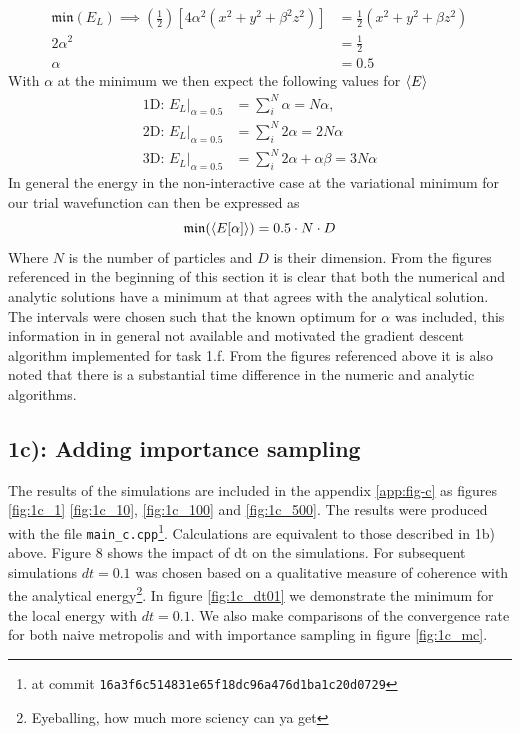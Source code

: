 \begin{align}
\mathfrak{min}(E_L)  \implies \left(\frac{1}{2}\right)[4\alpha^2 (x^2 + y^2 + \beta^2 z^2) ] &= \frac{1}{2} (x^2 + y^2 + \beta z^2) \\
 2 \alpha ^2  &= \frac{1}{2} \\
 \alpha &= 0.5
\end{align}
With $\alpha$ at the minimum we then expect the following values for $\langle E \rangle$
\begin{equation}
\begin{split}
\text{1D: }E_L |_{\alpha = 0.5} &= \sum_i^N \alpha = N \alpha,\\
\text{2D: }E_L|_{\alpha = 0.5} &= \sum_i^N  2\alpha = 2N \alpha \\
\text{3D: }E_L|_{\alpha = 0.5} &= \sum_i^N  2\alpha + \alpha \beta  = 3N\alpha
\end{split}
\end{equation}
In general the energy in the non-interactive case at the variational minimum for our trial wavefunction can then be expressed as 
\begin{equation}
\mathfrak{min}(\langle E[\alpha] \rangle) = 0.5 \cdot N \cdot D  
\end{equation}
Where $N$ is the number of particles and $D$ is their dimension. From the figures referenced in the beginning of this section it is clear that both the numerical and analytic solutions have a minimum at that  agrees with the analytical solution. The intervals  were chosen such that the known optimum for $\alpha$ was included, this information in in general not available and motivated the gradient descent algorithm implemented for task 1.f. From the figures referenced above it is also noted that there is a substantial time difference in the numeric and analytic algorithms. 

\subsection*{\textbf{1c):} Adding importance sampling}

The results of the simulations are included in the appendix \ref{app:fig-c} as figures \ref{fig:1c_1} \ref{fig:1c_10}, \ref{fig:1c_100} and \ref{fig:1c_500}. 
The results were produced with the file \lstinline{main_c.cpp}\footnote{at commit \lstinline{16a3f6c514831e65f18dc96a476d1ba1c20d0729}}. 
Calculations are equivalent to those described in 1b) above.
Figure 8 shows the impact of dt on the simulations. For subsequent simulations $dt = 0.1$ was chosen based on a qualitative measure of coherence with the analytical energy\footnote{Eyeballing, how much more sciency can ya get}.  
In figure \ref{fig:1c_dt01} we demonstrate the minimum for the local energy with $dt = 0.1$. 
We also make comparisons of the convergence rate for both naive metropolis and with importance sampling in figure \ref{fig:1c_mc}.

